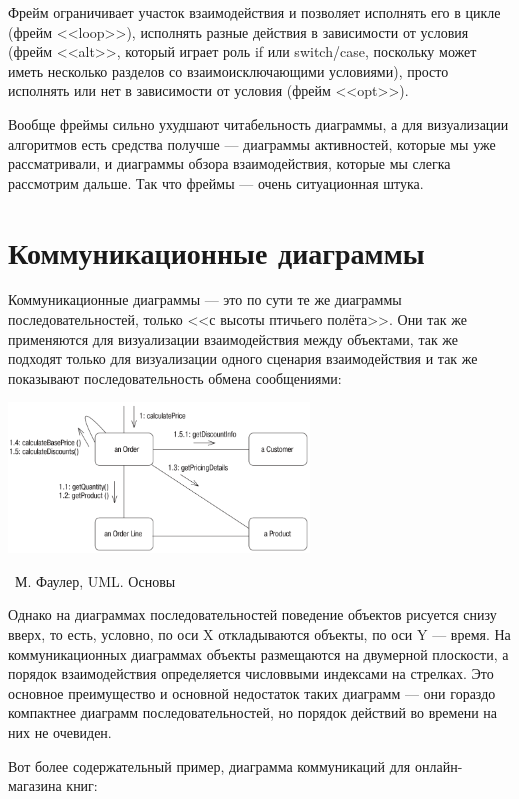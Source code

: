 \documentclass[a5paper]{article}
\newcommand{\attribution}[1] {
    \vspace{-5mm}\begin{flushright}\begin{scriptsize}%
    {\textcopyright\, #1}\end{scriptsize}\end{flushright}
}
\begin{document}
Фрейм ограничивает участок взаимодействия и позволяет исполнять его в цикле (фрейм <<loop>>), исполнять разные действия в зависимости от условия (фрейм <<alt>>, который играет роль if или switch/case, поскольку может иметь несколько разделов со взаимоисключающими условиями), просто исполнять или нет в зависимости от условия (фрейм <<opt>>).

Вообще фреймы сильно ухудшают читабельность диаграммы, а для визуализации алгоритмов есть средства получше --- диаграммы активностей, которые мы уже рассматривали, и диаграммы обзора взаимодействия, которые мы слегка рассмотрим дальше. Так что фреймы --- очень ситуационная штука.

\section{Коммуникационные диаграммы}

Коммуникационные диаграммы --- это по сути те же диаграммы последовательностей, только <<с высоты птичьего полёта>>. Они так же применяются для визуализации взаимодействия между объектами, так же подходят только для визуализации одного сценария взаимодействия и так же показывают последовательность обмена сообщениями:

\begin{center}
    \includegraphics[width=0.6\textwidth]{communicationDiagram.png}
    \attribution{М. Фаулер, UML. Основы}
\end{center}

Однако на диаграммах последовательностей поведение объектов рисуется снизу вверх, то есть, условно, по оси X откладываются объекты, по оси Y --- время. На коммуникационных диаграммах объекты размещаются на двумерной плоскости, а порядок взаимодействия определяется числоввыми индексами на стрелках. Это основное преимущество и основной недостаток таких диаграмм --- они гораздо компактнее диаграмм последовательностей, но порядок действий во времени на них не очевиден.

Вот более содержательный пример, диаграмма коммуникаций для онлайн-магазина книг:
\end{document}
